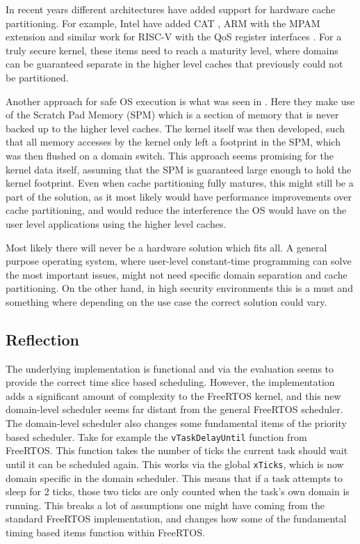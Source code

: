 In recent years different architectures have added support for hardware
cache partitioning. For example, Intel have added
CAT \cite{IntroductionCacheAllocation}, ARM with the MPAM
extension \cite{LearnarchitectureMemory} and similar work for RISC-V with the
QoS register interfaces \cite{11IntroductionRISCV}. For a truly secure kernel,
these items need to reach a maturity level, where domains can be guaranteed
separate in the higher level caches that previously could not be partitioned.

Another approach for safe OS execution is what was seen in \cite{karlsson2025}.
Here they make use of the Scratch Pad Memory (SPM) which is a section of memory
that is never backed up to the higher level caches. The kernel itself was then
developed, such that all memory accesses by the kernel only left a footprint in
the SPM, which was then flushed on a domain switch. This approach seems
promising for the kernel data itself, assuming that the SPM is guaranteed large
enough to hold the kernel footprint. Even when cache partitioning fully
matures, this might still be a part of the solution, as it most likely would
have performance improvements over cache partitioning, and would reduce the
interference the OS would have on the user level applications using the higher
level caches.

Most likely there will never be a hardware solution which fits all. A general
purpose operating system, where user-level constant-time programming can solve
the most important issues, might not need specific domain separation and cache
partitioning. On the other hand, in high security environments this is a must
and something where depending on the use case the correct solution could
vary.

\subsection{Reflection}
The underlying implementation is functional and via the evaluation seems to
provide the correct time slice based scheduling. However, the implementation
adds a significant amount of complexity to the FreeRTOS kernel, and this new
domain-level scheduler seems far distant from the general FreeRTOS scheduler.
The domain-level scheduler also changes some fundamental items of the priority
based scheduler. Take for example the \texttt{vTaskDelayUntil} function from
FreeRTOS. This function takes the number of ticks the current task should wait
until it can be scheduled again. This works via the global \texttt{xTicks},
which is now domain specific in the domain scheduler. This means that if a
task attempts to sleep for 2 ticks, those two ticks are only counted when the
task's own domain is running. This breaks a lot of assumptions one might have
coming from the standard FreeRTOS implementation, and changes how some of the
fundamental timing based items function within FreeRTOS. 

